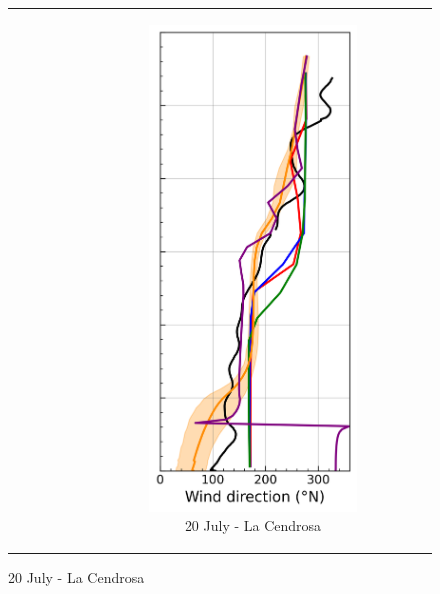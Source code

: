 \begin{figure}[hbtp]
{\begin{tabular}{@{}cccc@{}}
\begin{subfigure}[t]{0.283\textwidth}
        \end{subfigure} &
        \begin{subfigure}[t]{0.283\textwidth}
            \caption{20 July - La Cendrosa}
            \includegraphics[width=\textwidth]{images/chap6/profiles/profile_cendrosa_wind_direction_2007_.png}

\end{subfigure}
\end{tabular}}
\end{figure}
